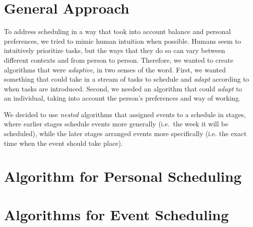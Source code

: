 \documentclass{article}
\begin{document}
\section{General Approach}
	To address scheduling in a way that took into account balance and personal preferences, we tried to mimic human intuition when possible.
	Humans seem to intuitively prioritize tasks, but the ways that they do so can vary between different contexts and from person to person.
	Therefore, we wanted to create algorithms that were \emph{adaptive}, in two senses of the word.
	First, we wanted something that could take in a stream of tasks to schedule and \emph{adapt} according to when tasks are introduced.
	Second, we needed an algorithm that could \emph{adapt} to an individual, taking into account the person's preferences and way of working.

	We decided to use \emph{nested} algorithms that assigned events to a schedule in stages, where earlier stages schedule events more generally (i.e.~the week it will be scheduled), while the later stages arranged events more specifically (i.e. the exact time when the event should take place).

\section{Algorithm for Personal Scheduling}


\section{Algorithms for Event Scheduling}
\end{document}
